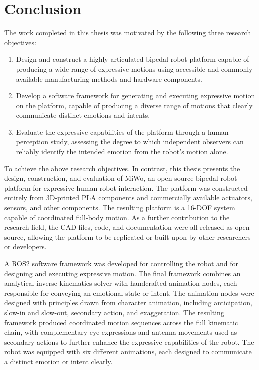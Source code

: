 

\chapter{Conclusion}
The work completed in this thesis was motivated by the following three research objectives: 
\begin{enumerate}
    \item Design and construct a highly articulated bipedal robot platform capable of producing a wide range of expressive motions using accessible and commonly available manufacturing methods and hardware components.

    \item Develop a software framework for generating and executing expressive motion on the platform, capable of producing a diverse range of motions that clearly communicate distinct emotions and intents.

    \item Evaluate the expressive capabilities of the platform through a human perception study, assessing the degree to which independent observers can reliably identify the intended emotion from the robot's motion alone.
\end{enumerate}

To achieve the above research objectives. In contrast, this thesis presents the design, construction, and evaluation of MiWo, an open-source bipedal robot platform for expressive human-robot interaction. The platform was constructed entirely from 3D-printed PLA components and commercially available actuators, sensors, and other components. The resulting platform is a 16-DOF system capable of coordinated full-body motion. As a further contribution to the research field, the CAD files, code, and documentation were all released as open source, allowing the platform to be replicated or built upon by other researchers or developers. 

A ROS2 software framework was developed for controlling the robot and for designing and executing expressive motion. The final framework combines an analytical inverse kinematics solver with handcrafted animation nodes, each responsible for conveying an emotional state or intent. The animation nodes were designed with principles drawn from character animation, including anticipation, slow-in and slow-out, secondary action, and exaggeration. The resulting framework produced coordinated motion sequences across the full kinematic chain, with complementary eye expressions and antenna movements used as secondary actions to further enhance the expressive capabilities of the robot. The robot was equipped with six different animations, each designed to communicate a distinct emotion or intent clearly.

